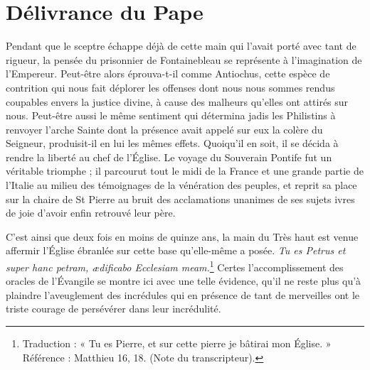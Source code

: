 \section*{Délivrance du Pape}
Pendant que le sceptre échappe déjà de cette main qui l'avait porté avec tant de rigueur, la pensée du prisonnier de Fontainebleau se représente à l'imagination de l'Empereur. Peut-être alors éprouva-t-il comme Antiochus, cette espèce de contrition qui nous fait déplorer les offenses dont nous nous sommes rendus coupables envers la justice divine, à cause des malheurs qu'elles ont attirés sur nous. Peut-être aussi le même sentiment qui détermina jadis les Philistins à renvoyer l'arche Sainte dont la présence avait appelé sur eux la colère du Seigneur, produisit-il en lui les mêmes effets. Quoiqu'il en soit, il se décida à rendre la liberté au chef de l'Église. Le voyage du Souverain Pontife fut un véritable triomphe ; il parcourut tout le midi de la France et une grande partie de l'Italie au milieu des témoignages de la vénération des peuples, et reprit sa place sur la chaire de St Pierre au bruit des acclamations unanimes de ses sujets ivres de joie d'avoir enfin retrouvé leur père.

C'est ainsi que deux fois en moins de quinze ans, la main du
Très haut est venue affermir l'Église ébranlée sur cette base qu'elle-même a posée. \textit{Tu es Petrus et super hanc petram, ædificabo Ecclesiam meam.}\footnote{Traduction : « Tu es Pierre, et sur cette pierre je bâtirai mon Église. » Référence : Matthieu 16, 18. (Note du transcripteur).} Certes l'accomplissement des oracles de l'Évangile se montre ici avec une telle évidence, qu'il ne reste plus qu'à plaindre l'aveuglement des incrédules qui en présence de tant de merveilles ont le triste courage de persévérer dans leur incrédulité.

